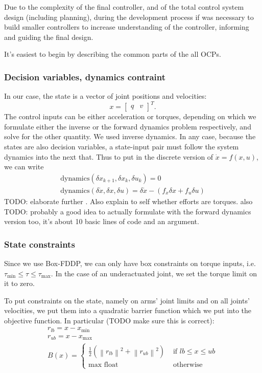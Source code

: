 \documentclass{article}
\begin{document}
Due to the complexity of the final controller, and of the total
control system design (including planning), during the development
process if was necessary to build smaller controllers
to increase understanding of the controller, informing 
and guiding the final design. 

It's easiest to begin by describing the common parts
of the all OCPs.
\subsubsection{Decision variables, dynamics contraint}
In our case, the state is a vector of joint positions and velocities:
\begin{equation}
 x = \begin{bmatrix} q & v \end{bmatrix}^{ T }   .
\end{equation}
The control inputs can be either acceleration or torques, 
depending on which we formulate either the inverse or the forward dynamics
problem respectively, and solve for the other quantity.
We used inverse dynamics.
In any case, because the states are also decision variables,
a state-input pair must follow the system dynamics into the next that.
Thus to put in the discrete version of $ \dot{x}= f (x,u)    $, we can write
\begin{gather}
 \text{dynamics} ( \delta x_{ k+1 }, \delta  x_{ k }, \delta  u_{ k } ) =0 \\
 \text{dynamics} (\delta \dot{x}, \delta x, \delta u)=
\delta \dot{x} - (f_{ x } \delta x + f_{ u } \delta u)
\end{gather}
TODO: elaborate further . Also explain to self whether efforts are torques.
also TODO: probably a good idea to actually formulate with the forward 
dynamics version too, it's about 10 basic lines of code and an argument.

\subsubsection{State constraints}
Since we use Box-FDDP, we can only have box constraints on torque inputs,
i.e. $ \tau_{ \min } \leq \tau \leq \tau_{ \max } $.
In the case of an underactuated joint, we set the torque limit on it to zero.

To put constraints on the state, 
namely on arms' joint limits and on all joints' velocities, 
we put them into a quadratic barrier function 
which we put into the objective function.
In particular (TODO make sure this is correct):
\begin{gather}
		r_{ lb } = x - x_{ \min } \\
		r_{ ub } = x - x_{ \max } \\
		B(x) =
\left\{ 
\begin{array}{ll}
		\frac{1}{2}  (\left\lVert r_{ lb } \right \rVert ^{ 2 }
		+ \left\lVert r_{ ub } \right \rVert ^{ 2 }) & \text{ if } 
		lb \leq x \leq ub \\
		\max \text{ float} & \text{ otherwise}
\end{array}
\right . 
\end{gather}
\end{document}
